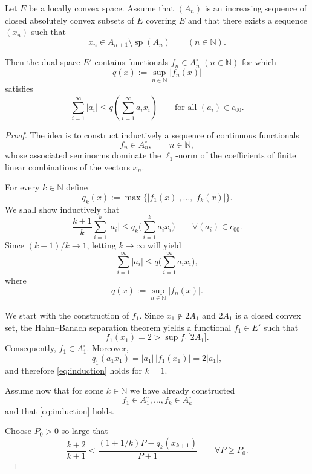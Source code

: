 \documentclass[10pt,a4paper]{amsart}
\begin{document}
\begin{proposition}
Let $E$ be a locally convex space. Assume that  $(A_n)$ is an increasing sequence of closed absolutely convex subsets of $E$ covering $E$
and that there exists a sequence $(x_n)$ such that
\[
x_n\in A_{n+1}\setminus \operatorname{sp}(A_n)
\qquad (n\in\mathbb N).
\]

Then the dual space $E'$ contains functionals $f_n\in A_n^\circ$ $(n\in\mathbb N)$ for which
\[
q(x):=\sup_{n\in\mathbb N}|f_n(x)|
\]
satisfies
\[
\sum_{i=1}^{\infty}|a_i|
\le
q\!\left(\sum_{i=1}^{\infty}a_i x_i\right)
\qquad\text{for all }(a_i)\in c_{00}.
\]
\end{proposition}

\begin{proof}
The idea is to construct inductively a sequence of continuous functionals
\[
f_n\in A_n^\circ,\qquad n\in\mathbb N,
\]
whose associated seminorms dominate the $\ell_1$-norm of the coefficients of finite linear combinations of the vectors $x_n$.

For every $k\in\mathbb N$ define
\[
q_k(x):=\max\{|f_1(x)|,\ldots,|f_k(x)|\}.
\]
We shall show inductively that
\begin{equation}\label{eq:induction}
\frac{k+1}{k}\sum_{i=1}^{k}|a_i|
   \le
q_k\Big(\sum_{i=1}^{k}a_ix_i\Big)
\qquad
\forall (a_i)\in c_{00}.
\end{equation}
Since $(k+1)/k\to1$, letting $k\to\infty$ will yield
\[
\sum_{i=1}^{\infty}|a_i|
   \le
q\Big(\sum_{i=1}^{\infty}a_ix_i\Big),
\]
where
\[
q(x):=\sup_{n\in\mathbb N}|f_n(x)|.
\]

\medskip

We start with the construction of $f_1$. Since
$x_1\notin 2 A_1$
and $2 A_1$ is a closed convex set, the Hahn--Banach separation theorem yields a functional
$f_1\in E'$ such that
\[
f_1(x_1)=2
   >
\sup f_1\Big[2 A_1\Big].
\]
Consequently,
$f_1\in A_1^\circ$.
Moreover,
\[
q_1(a_1x_1)=|a_1|\,|f_1(x_1)|
=2 |a_1|,
\]
and therefore \eqref{eq:induction} holds for $k=1$.

\medskip

Assume now that for some $k\in\mathbb N$ we have already constructed
\[
f_1\in A_1^\circ,\ldots,f_k\in A_k^\circ
\]
and that \eqref{eq:induction} holds.

Choose $P_0>0$ so large that
\begin{equation}\label{eq:P0}
\frac{k+2}{k+1}
<
\frac{(1+1/k)P-q_k(x_{k+1})}{P+1}
\qquad
\forall P\ge P_0.
\end{equation}


\end{proof}
\end{document}
